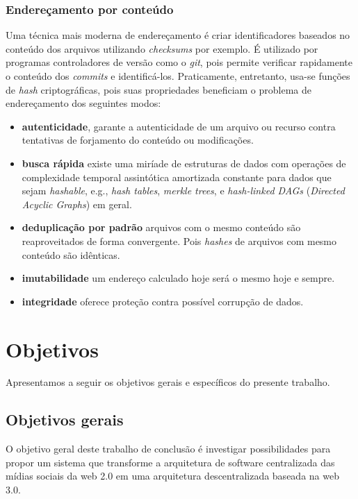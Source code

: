 \subsection{Endereçamento por conteúdo}

Uma técnica mais moderna de endereçamento é criar identificadores baseados no conteúdo dos arquivos utilizando \textit{checksums} por exemplo.
É utilizado por programas controladores de versão como o \textit{git}, pois permite verificar rapidamente o conteúdo dos \textit{commits} e identificá-los.
Praticamente, entretanto, usa-se funções de \textit{hash} criptográficas, pois suas propriedades beneficiam o problema de endereçamento dos seguintes modos:

\begin{itemize}
    \item \textbf{autenticidade}, garante a autenticidade de um arquivo ou recurso contra tentativas de forjamento do conteúdo ou modificações.
    \item \textbf{busca rápida} existe uma miríade de estruturas de dados com operações de complexidade temporal assintótica amortizada constante para dados que sejam \textit{hashable}, e.g., \textit{hash tables}, \textit{merkle trees}, e \textit{hash-linked DAGs} (\textit{Directed Acyclic Graphs}) em geral.
    \item \textbf{deduplicação por padrão} arquivos com o mesmo conteúdo são reaproveitados de forma convergente.
          Pois \textit{hashes} de arquivos com mesmo conteúdo são idênticas.
    \item \textbf{imutabilidade} um endereço calculado hoje será o mesmo hoje e sempre.
    \item \textbf{integridade} oferece proteção contra possível corrupção de dados.
\end{itemize}

\chapter{Objetivos}

Apresentamos a seguir os objetivos gerais e específicos do presente trabalho.

\section{Objetivos gerais}

O objetivo geral deste trabalho de conclusão é investigar possibilidades para propor um sistema que transforme a arquitetura de software centralizada das mídias sociais da web 2.0 em uma arquitetura descentralizada baseada na web 3.0.

